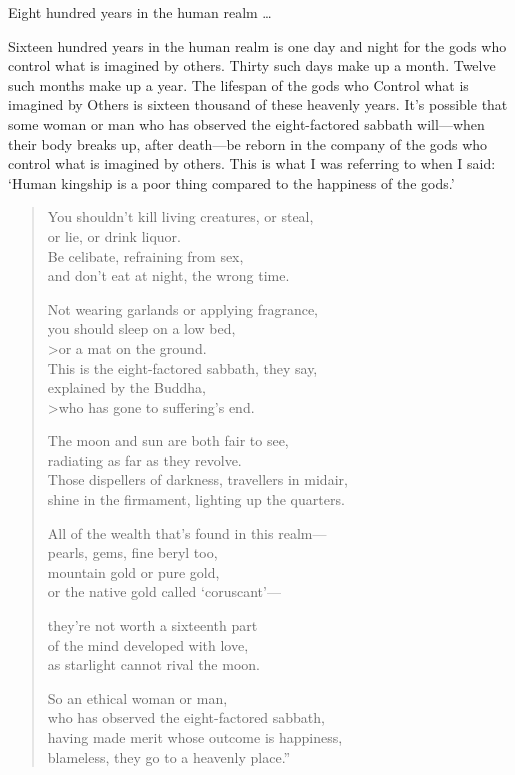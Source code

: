 \documentclass[12pt,openany]{book}%
\begin{document}
Eight hundred years in the human realm … 

Sixteen hundred years in the human realm is one day and night for the gods who control what is imagined by others. Thirty such days make up a month. Twelve such months make up a year. The lifespan of the gods who Control what is imagined by Others is sixteen thousand of these heavenly years. It’s possible that some woman or man who has observed the eight-factored sabbath will—when their body breaks up, after death—be reborn in the company of the gods who control what is imagined by others. This is what I was referring to when I said: ‘Human kingship is a poor thing compared to the happiness of the gods.’ 

\begin{verse}%
You shouldn’t kill living creatures, or steal, \\
or lie, or drink liquor. \\
Be celibate, refraining from sex, \\
and don’t eat at night, the wrong time. 

Not wearing garlands or applying fragrance, \\
you should sleep on a low bed, \\>or a mat on the ground. \\
This is the eight-factored sabbath, they say, \\
explained by the Buddha, \\>who has gone to suffering’s end. 

The moon and sun are both fair to see, \\
radiating as far as they revolve. \\
Those dispellers of darkness, travellers in midair, \\
shine in the firmament, lighting up the quarters. 

All of the wealth that’s found in this realm—\\
pearls, gems, fine beryl too, \\
mountain gold or pure gold, \\
or the native gold called ‘coruscant’—

they’re not worth a sixteenth part \\
of the mind developed with love, \\
as starlight cannot rival the moon. 

So an ethical woman or man, \\
who has observed the eight-factored sabbath, \\
having made merit whose outcome is happiness, \\
blameless, they go to a heavenly place.” 

%
\end{verse}
\end{document}
